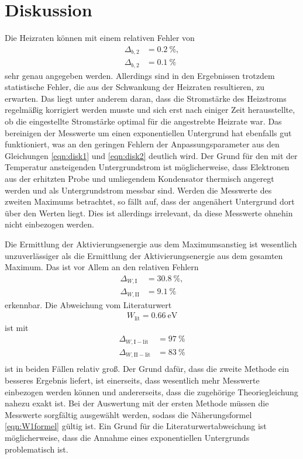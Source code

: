 \section{Diskussion}
\label{sec:Diskussion}

Die Heizraten können mit einem relativen Fehler von
\begin{align}
  \Delta_{b,2} &= \SI{0.2}{\percent}, \\
  \Delta_{b,2} &= \SI{0.1}{\percent}
\end{align}
sehr genau angegeben werden. Allerdings sind in den Ergebnissen trotzdem statistische Fehler,
die aus der Schwankung der Heizraten resultieren, zu erwarten. Das liegt unter anderem
daran, dass die Stromstärke des Heizstroms regelmäßig korrigiert werden musste und sich erst
nach einiger Zeit herausstellte, ob die eingestellte Stromstärke optimal für die angestrebte
Heizrate war. Das bereinigen der Messwerte um einen exponentiellen Untergrund hat ebenfalls gut funktioniert,
was an den geringen Fehlern der Anpassungsparameter aus den Gleichungen \eqref{eqn:disk1} und \eqref{eqn:disk2} deutlich
wird. Der Grund für den mit der Temperatur ansteigenden Untergrundstrom ist möglicherweise, dass
Elektronen aus der erhitzten Probe und umliegendem Kondensator thermisch angeregt werden und als
Untergrundstrom messbar sind. Werden die Messwerte des zweiten Maximums betrachtet, so fällt auf, dass der
angenähert Untergrund dort über den Werten liegt. Dies ist allerdings irrelevant, da diese Messwerte ohnehin
nicht einbezogen werden.

Die Ermittlung der Aktivierungsenergie aus dem Maximumsanstieg ist wesentlich
unzuverlässiger als die Ermittlung der Aktivierungsenergie aus dem gesamten Maximum. Das ist vor Allem an
den relativen Fehlern
\begin{align}
  \Delta_{W,\text{I}} &= \SI{30.8}{\percent}, \\
  \Delta_{W,\text{II}} &= \SI{9.1}{\percent}
\end{align}
erkennbar. Die Abweichung vom Literaturwert \cite{paper}
\begin{align}
  W_\text{lit} = \SI{0.66}{\electronvolt}
\end{align}
ist mit
\begin{align}
  \Delta_{W,\text{I} - \text{lit}} &= \SI{97}{\percent} \\
  \Delta_{W,\text{II} - \text{lit}} &= \SI{83}{\percent} \\
\end{align}
ist in beiden Fällen relativ groß.
Der Grund dafür, dass die zweite Methode ein besseres Ergebnis liefert, ist einerseits, dass wesentlich
mehr Messwerte einbezogen werden können und andererseits, dass die zugehörige Theoriegleichung nahezu exakt ist.
Bei der Auswertung mit der ersten Methode müssen die Messwerte sorgfältig ausgewählt werden, sodass
die Näherungsformel \eqref{eqn:W1formel} gültig ist. Ein Grund für die Literaturwertabweichung ist möglicherweise,
dass die Annahme eines exponentiellen Untergrunds problematisch ist.

